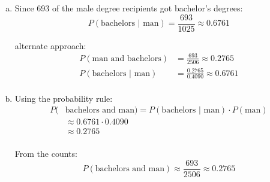 \documentclass[letterpaper]{exam}
\begin{document}
\begin{description}
\begin{enumerate}[(a)]
          \item

            Since 693 of the male degree recipients got bachelor's degrees:
            \[
              P( \text{bachelors } | \text { man} ) = \frac{693}{1025} 
                \approx \boxed{ 0.6761 } 
            \]

            alternate approach:
            \begin{align*}
              P( \text{man and bachelors} )         & = \frac{693}{2506} \approx 0.2765 \\
              P( \text{bachelors } | \text { man} ) & = \frac{0.2765}{0.4090}
                \approx 0.6761 \\
            \end{align*}
          \item Using the probability rule:
            \begin{align*}
              P( & \text{bachelors and man}) = 
                P( \text{bachelors } | \text { man} ) \cdot P( \text{man} ) \\
                & \approx 0.6761 \cdot 0.4090  \\
                & \approx \boxed{ 0.2765 }  \\
            \end{align*}

            From the counts:
            \[
              P( \text{bachelors and man}) \approx \frac{693}{2506} \approx 0.2765 
            \]

        \end{enumerate}





\end{description}
\end{document}
